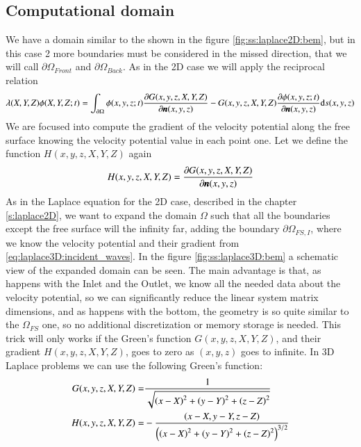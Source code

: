 \subsection{Computational domain}
\label{sss:laplace3D:computational_domain}
%
We have a domain similar to the shown in the figure
\ref{fig:ss:laplace2D:bem}, but in this case 2 more boundaries
must be considered in the missed direction, that we will call
$\partial \Omega_{Front}$ and $\partial \Omega_{Back}$. As in
the 2D case we will apply the reciprocal relation
%
\begin{eqnarray}
	\label{eq:laplace3D:reciprocal_relation}
	\lambda(X, Y, Z) \phi(X, Y, Z; t) = \int_{\partial \Omega}
	\phi(x, y, z; t) \frac{\partial G(x, y, z, X, Y, Z)}{\partial \bs{n}(x, y, z)} -
	G(x, y, z, X, Y, Z) \frac{\partial \phi(x, y, z; t)}{\partial \bs{n}(x, y, z)}
	\mbox{d} s(x, y, z)
\end{eqnarray}
%
We are focused into compute the gradient of the velocity
potential along the free surface knowing the velocity
potential value in each point one. Let we define the
function $H(x,y,z,X,Y,Z)$ again
%
\begin{eqnarray*}
H(x, y, z, X, Y, Z) = \frac{\partial G(x, y, z, X, Y, Z)}{\partial \bs{n}(x, y, z)}
\end{eqnarray*}
%
As in the Laplace equation for the 2D case, described in the
chapter \ref{s:laplace2D}, we want to expand the domain $\Omega$
such that all the boundaries except the free surface will the
infinity far, adding the boundary $\partial \Omega_{FS,I}$, where
we know the velocity potential and their gradient from
\ref{eq:laplace3D:incident_waves}. In the figure
\ref{fig:ss:laplace3D:bem} a schematic view of the expanded
domain can be seen.\rc
%
The main advantage is that, as happens with the Inlet and the
Outlet, we know all the needed data about the velocity potential,
so we can significantly reduce the linear system matrix dimensions,
and as happens with the bottom, the geometry is so quite similar
to the $\Omega_{FS}$ one, so no additional discretization or memory
storage is needed.\rc
%
This trick will only works if the Green's function $G(x,y,z,X,Y,Z)$,
and their gradient $H(x,y,z,X,Y,Z)$, goes to zero as $(x,y,z)$ goes
to infinite. In 3D Laplace problems we can use the following Green's
function:
%
\begin{eqnarray}
	\label{eq:laplace3D:g}
	G(x,y,z,X,Y,Z) = & \dsty{\frac{1}{\sqrt{\left(x - X\right)^2 + \left(y - Y\right)^2 + \left(z - Z\right)^2}}}
	\\
	\label{eq:laplace3D:h}
	H(x,y,z,X,Y,Z) = & - \dsty{\frac{\left( x - X, y - Y, z - Z \right)}{\left(\left(x - X\right)^2 + \left(y - Y\right)^2 + \left(z - Z\right)^2\right)^{3/2}}}
\end{eqnarray}
